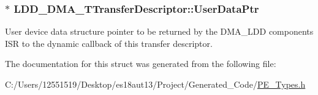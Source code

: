 \subsubsection[{User\+Data\+Ptr}]{$\ast$ L\+D\+D\+\_\+\+D\+M\+A\+\_\+\+T\+Transfer\+Descriptor\+::\+User\+Data\+Ptr}\label{struct_l_d_d___d_m_a___t_transfer_descriptor_a4136d6742944c7b04a94695c78b581b8}
User device data structure pointer to be returned by the D\+M\+A\+\_\+\+L\+D\+D component\textquotesingle{}s I\+S\+R to the dynamic callback of this transfer descriptor. 

The documentation for this struct was generated from the following file\+:\begin{DoxyCompactItemize}
\item 
C\+:/\+Users/12551519/\+Desktop/es18aut13/\+Project/\+Generated\+\_\+\+Code/\hyperlink{_p_e___types_8h}{P\+E\+\_\+\+Types.\+h}\end{DoxyCompactItemize}
